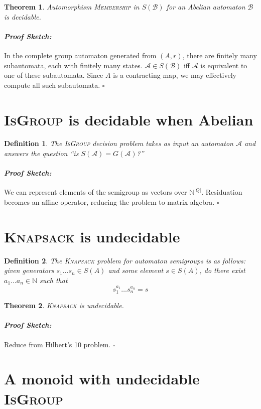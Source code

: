 \documentclass[a0]{a0poster}
\newcommand{\decprob}[1]{\textsc{#1}}
\newcommand{\N}{\mathbb{N}}
\newcommand{\A}{\mathcal{A}}
\newcommand{\B}{\mathcal{B}}
\theoremstyle{pleasant}
\newtheorem{theorem}{Theorem}
\newtheorem{definition}{Definition}
\newenvironment{proofsketch}{\paragraph{\Large \normalfont \textit{Proof Sketch:}}}{\hfill$\square$}
\newcommand{\0}{\underline{0}}
\newcommand{\1}{\underline{1}}
\newcommand{\2}{\underline{2}}
\begin{document}
\begin{multicols}{3}
\begin{theorem}
  Automorphism \decprob{Membership} in $S(\B)$ for an Abelian
  automaton $\B$ is decidable.
\end{theorem}

\begin{proofsketch}
  In the complete group automaton generated from $(A,r)$, there are
  finitely many subautomata, each with finitely many states.
  $\A \in S(\B)$ iff $\A$ is equivalent to one of these subautomata.
  Since $A$ is a contracting map, we may effectively compute all such
  subautomata.
\end{proofsketch}

\section*{\textsc{IsGroup} is decidable when Abelian}

\begin{definition}
  The \decprob{IsGroup} decision problem takes as input an automaton
  $\A$ and answers the question ``is $S(\A) = G(\A)$?''
\end{definition}

\begin{proofsketch} 
  We can represent elements of the semigroup as vectors over
  $\mathbb{N}^{|Q|}$. Residuation becomes an affine operator, reducing
  the problem to matrix algebra.
\end{proofsketch} 

\section*{\textsc{Knapsack} is undecidable}

\begin{definition}
  The \textsc{Knapsack} problem for automaton semigroups is as
  follows: given generators $s_1\ldots s_n \in S(A)$ and some element
  $s \in S(A)$, do there exist $a_1\ldots a_n \in \N$ such
  that \[s_1^{a_1}\ldots s_n^{a_n} = s \]
\end{definition}

\begin{theorem}
  \textsc{Knapsack} is undecidable.
\end{theorem}

\begin{proofsketch}
  Reduce from Hilbert's 10 problem.
\end{proofsketch}

\section*{A monoid with undecidable \textsc{IsGroup}}


\end{multicols}
\end{document}
